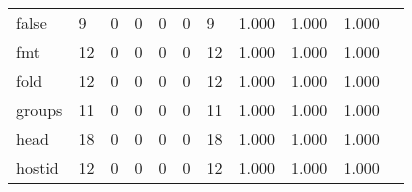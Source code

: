 \begin{longtable}{lp{1.2cm}p{1.2cm}p{1.2cm}p{1.2cm}p{1.2cm}p{1.2cm}p{1.2cm}p{1.2cm}p{1.2cm}p{1.2cm}}
false     &                                     9 &                                                  0 &                                                  0 &                                                  0 &                                                  0 &                                                  9 &                                              1.000 &                                              1.000 &                                              1.000 \\
fmt       &                                    12 &                                                  0 &                                                  0 &                                                  0 &                                                  0 &                                                 12 &                                              1.000 &                                              1.000 &                                              1.000 \\
fold      &                                    12 &                                                  0 &                                                  0 &                                                  0 &                                                  0 &                                                 12 &                                              1.000 &                                              1.000 &                                              1.000 \\
groups    &                                    11 &                                                  0 &                                                  0 &                                                  0 &                                                  0 &                                                 11 &                                              1.000 &                                              1.000 &                                              1.000 \\
head      &                                    18 &                                                  0 &                                                  0 &                                                  0 &                                                  0 &                                                 18 &                                              1.000 &                                              1.000 &                                              1.000 \\
hostid    &                                    12 &                                                  0 &                                                  0 &                                                  0 &                                                  0 &                                                 12 &                                              1.000 &                                              1.000 &                                              1.000 \\

\end{longtable}
